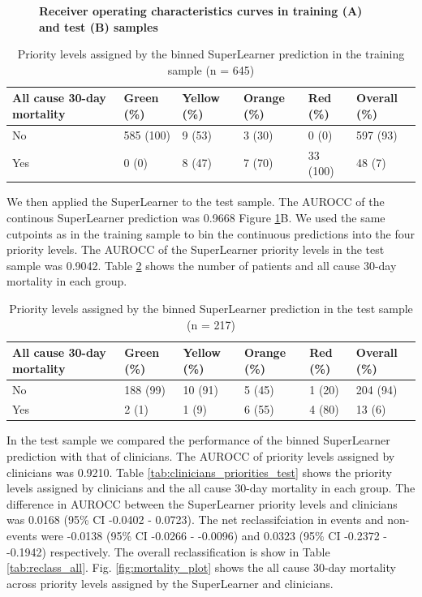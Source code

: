 \documentclass[10pt,letterpaper]{article}\usepackage[]{graphicx}\usepackage[]{color}
\begin{document}
\begin{figure}[!h]
  \caption{\bf Receiver operating characteristics curves in training (A) and test
    (B) samples}
  \label{fig:roc_plot}
\end{figure}

\begin{table}[!ht]
\centering
\caption{Priority levels assigned by the binned SuperLearner prediction in the training sample (n = 645)} 
\label{tab:superlearner_priorities_train}
\begin{tabular}{llllll}
  \hline
All cause 30-day mortality & Green (\%) & Yellow (\%) & Orange (\%) & Red (\%) & Overall (\%) \\ 
  \hline
No & 585 (100) & 9 (53) & 3 (30) & 0 (0) & 597 (93) \\ 
  Yes & 0 (0) & 8 (47) & 7 (70) & 33 (100) & 48 (7) \\ 
   \hline
\end{tabular}
\end{table}


We then applied the SuperLearner to the test sample. The AUROCC of the continous
SuperLearner prediction was 0.9668 Figure
\ref{fig:roc_plot}B.  We used the same cutpoints as in the training sample to
bin the continuous predictions into the four priority levels. The AUROCC of the
SuperLearner priority levels in the test sample was
0.9042.  Table
\ref{tab:superlearner_priorities_test} shows the number of patients and all
cause 30-day mortality in each group.

\begin{table}[!ht]
\centering
\caption{Priority levels assigned by the binned SuperLearner prediction in the test sample (n = 217)} 
\label{tab:superlearner_priorities_test}
\begin{tabular}{llllll}
  \hline
All cause 30-day mortality & Green (\%) & Yellow (\%) & Orange (\%) & Red (\%) & Overall (\%) \\ 
  \hline
No & 188 (99) & 10 (91) & 5 (45) & 1 (20) & 204 (94) \\ 
  Yes & 2 (1) & 1 (9) & 6 (55) & 4 (80) & 13 (6) \\ 
   \hline
\end{tabular}
\end{table}


In the test sample we compared the performance of the binned SuperLearner
prediction with that of clinicians. The AUROCC of priority levels assigned by
clinicians was 0.9210. Table \ref{tab:clinicians_priorities_test}
shows the priority levels assigned by clinicians and the all cause 30-day
mortality in each group. The difference in AUROCC between the SuperLearner
priority levels and clinicians was 0.0168 (95\% CI -0.0402 - 0.0723). The
net reclassifciation in events and non-events were -0.0138 (95\% CI -0.0266 - -0.0096) and
0.0323 (95\% CI -0.2372 - -0.1942) respectively. The overall reclassification is show in Table
\ref{tab:reclass_all}. Fig. \ref{fig:mortality_plot} shows the all cause
30-day mortality across priority levels assigned by the SuperLearner and
clinicians.
\end{document}
